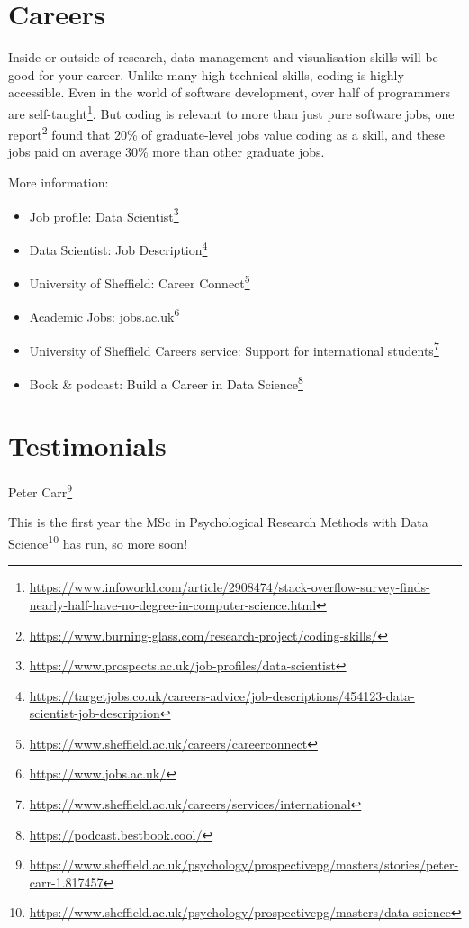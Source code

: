 \documentclass[
  12pt,
  a5paper,
]{book}
\DeclareRobustCommand{\href}[2]{#2\footnote{\url{#1}}}
\providecommand{\tightlist}{%
  \setlength{\itemsep}{0pt}\setlength{\parskip}{0pt}}
\begin{document}
\hypertarget{careers}{%
\section{Careers}\label{careers}}

Inside or outside of research, data management and visualisation skills will be good for your career. Unlike many high-technical skills, coding is highly accessible. Even in the world of software development, over half of programmers are \href{https://www.infoworld.com/article/2908474/stack-overflow-survey-finds-nearly-half-have-no-degree-in-computer-science.html}{self-taught}. But coding is relevant to more than just pure software jobs, \href{https://www.burning-glass.com/research-project/coding-skills/}{one report} found that 20\% of graduate-level jobs value coding as a skill, and these jobs paid on average 30\% more than other graduate jobs.

More information:

\begin{itemize}
\tightlist
\item
  \href{https://www.prospects.ac.uk/job-profiles/data-scientist}{Job profile: Data Scientist}
\item
  \href{https://targetjobs.co.uk/careers-advice/job-descriptions/454123-data-scientist-job-description}{Data Scientist: Job Description}
\item
  University of Sheffield: \href{https://www.sheffield.ac.uk/careers/careerconnect}{Career Connect}
\item
  Academic Jobs: \href{https://www.jobs.ac.uk/}{jobs.ac.uk}
\item
  University of Sheffield Careers service: \href{https://www.sheffield.ac.uk/careers/services/international}{Support for international students}
\item
  Book \& podcast: \href{https://podcast.bestbook.cool/}{Build a Career in Data Science}
\end{itemize}

\hypertarget{testimonials}{%
\section{Testimonials}\label{testimonials}}

\href{https://www.sheffield.ac.uk/psychology/prospectivepg/masters/stories/peter-carr-1.817457}{Peter Carr}

This is the first year the \href{https://www.sheffield.ac.uk/psychology/prospectivepg/masters/data-science}{MSc in Psychological Research Methods with Data Science} has run, so more soon!
\end{document}

